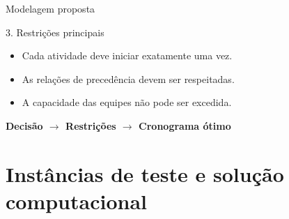 \documentclass{beamer}
\begin{document}
\begin{frame}{Modelagem proposta}
\begin{block}{3. Restrições principais}
    \begin{itemize}
        \setlength{\itemsep}{0.05cm}
        \item Cada atividade deve iniciar exatamente uma vez.
        \item As relações de precedência devem ser respeitadas.
        \item A capacidade das equipes não pode ser excedida.
    \end{itemize}

\end{block}

\vspace{-0.18cm}

\begin{center}
    \textbf{
    Decisão
    \(\rightarrow\)
    Restrições
    \(\rightarrow\)
    Cronograma ótimo
    }
\end{center}

\end{frame}

\section{Instâncias de teste e solução computacional}
\end{document}
